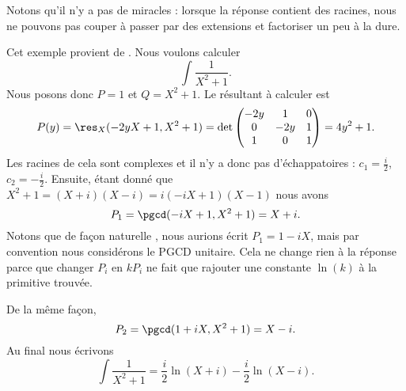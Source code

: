 Notons qu'il n'y a pas de miracles : lorsque la réponse contient des racines, nous ne pouvons pas couper à passer par des extensions et factoriser un peu à la dure.

\begin{example} \label{ExYQODuyU}
    Cet exemple provient de \cite{LTjwacY}. Nous voulons calculer
    \begin{equation}
        \int\frac{ 1 }{ X^2+1 }.
    \end{equation}
    Nous posons donc \( P=1\) et \( Q=X^2+1\). Le résultant à calculer est
    \begin{subequations}
        \begin{align}
            P(y)=\res_X(-2yX+1,X^2+1)=\det\begin{pmatrix}
                -2y    &   1    &   0    \\
                0    &   -2y    &   1    \\
                1    &   0    &   1
            \end{pmatrix}=4y^2+1.
        \end{align}
    \end{subequations}
    Les racines de cela sont complexes et il n'y a donc pas d'échappatoires : \( c_1=\frac{ i }{2}\), \( c_2=-\frac{ i }{2}\). Ensuite, étant donné que \( X^2+1=(X+i)(X-i)=i(-iX+1)(X-1)\) nous avons
    \begin{equation}
        P_1=\pgcd(-iX+1,X^2+1)=X+i.
    \end{equation}
    Notons que de façon naturelle , nous aurions écrit \( P_1=1-iX\), mais par convention nous considérons le PGCD unitaire. Cela ne change rien à la réponse parce que changer \( P_i\) en \( kP_i\) ne fait que rajouter une constante \( \ln(k)\) à la primitive trouvée.

    De la même façon,
    \begin{equation}
        P_2=\pgcd(1+iX,X^2+1)=X-i.
    \end{equation}
    Au final nous écrivons
    \begin{equation}
        \int\frac{1}{ X^2+1 }=\frac{ i }{2}\ln(X+i)-\frac{ i }{2}\ln(X-i).
    \end{equation}
\end{example}

